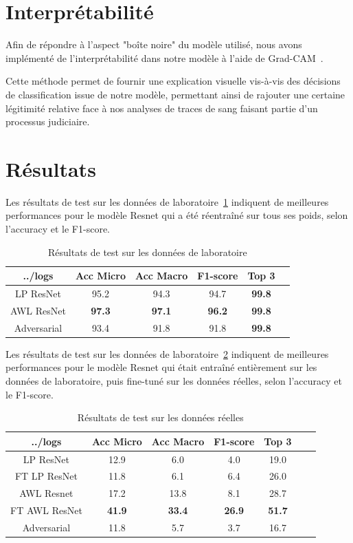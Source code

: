 \documentclass[a4paper]{article}
\begin{document}
\section{Interprétabilité}

Afin de répondre à l'aspect "boîte noire" du modèle utilisé, nous avons implémenté de l'interprétabilité dans notre modèle à l'aide de Grad-CAM~\cite{GRADCAM}. 

Cette méthode permet de fournir une explication visuelle vis-à-vis des décisions de classification issue de notre modèle, permettant ainsi de rajouter une certaine légitimité relative face à nos analyses de traces de sang faisant partie d'un processus judiciaire. 



\section{Résultats}

Les résultats de test sur les données de laboratoire~\ref{tab:results_lab} indiquent de meilleures performances pour le modèle Resnet qui a été réentraîné sur tous ses poids, selon l'accuracy et le F1-score. 

\begin{table}[ht]
  \centering
    \begin{tabular}{cccccc}
    \toprule
    ../logs & Acc Micro & Acc Macro & F1-score & Top 3 \\
    \midrule
    LP ResNet & 95.2 & 94.3 & 94.7 & \textbf{99.8} \\
    AWL ResNet & \textbf{97.3} & \textbf{97.1} & \textbf{96.2} & \textbf{99.8} \\
    Adversarial & 93.4 & 91.8 & 91.8 & \textbf{99.8} \\
    \bottomrule
    \end{tabular}
  \label{tab:results_lab}
  \caption{Résultats de test sur les données de laboratoire}
\end{table}

Les résultats de test sur les données de laboratoire~\ref{tab: results_real} indiquent de meilleures performances pour le modèle Resnet qui était entraîné entièrement sur les données de laboratoire, puis fine-tuné sur les données réelles, selon l'accuracy et le F1-score. 

\begin{table}[ht]
  \centering
    \begin{tabular}{ccccccc}
    \toprule
    ../logs & Acc Micro & Acc Macro & F1-score & Top 3 \\
    \midrule
    LP ResNet & 12.9 & 6.0 & 4.0 & 19.0 \\
    FT LP ResNet & 11.8 & 6.1 & 6.4 & 26.0 \\
    AWL Resnet & 17.2 & 13.8 & 8.1 & 28.7 \\
    FT AWL ResNet & \textbf{41.9} & \textbf{33.4} & \textbf{26.9} & \textbf{51.7} \\
    Adversarial & 11.8 & 5.7 & 3.7 & 16.7 \\
    \bottomrule
    \end{tabular}
  \label{tab: results_real}
   \caption{Résultats de test sur les données réelles}
\end{table}
\end{document}
